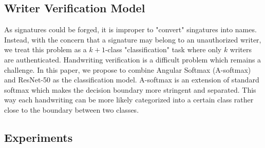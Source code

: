 \documentclass[sigconf]{acmart}
\begin{document}
\subsection{Writer Verification Model}
As signatures could be forged, it is improper to "convert" singatures into names. Instead, with the concern that a signature may belong to an unauthorized writer, we treat this problem as a $k+1$-class "classification" task where only $k$ writers are authenticated. Handwriting verification is a difficult problem which remains a challenge. In this paper, we propose to combine Angular Softmax (A-softmax) \cite{liu2017sphereface} and ResNet-50 \cite{he2016deep} as the classification model. A-softmax is an extension of standard softmax which makes the decision boundary more stringent and separated. This way each handwriting can be more likely categorized into a certain class rather close to the boundary between two classes. 

\subsection{Experiments}
\end{document}

